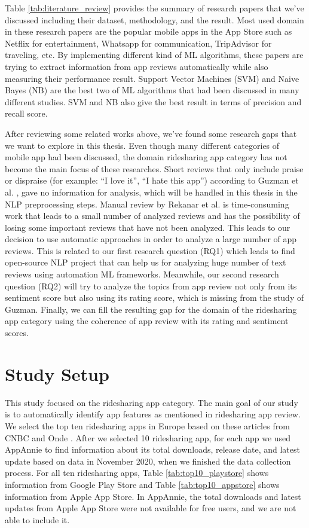 \documentclass[12pt]{article}
\begin{document}
Table \ref{tab:literature_review} provides the summary of research papers that we’ve discussed including their dataset, methodology, and the result. Most used domain in these research papers are the popular mobile apps in the App Store such as Netflix for entertainment, Whatsapp for communication, TripAdvisor for traveling, etc. By implementing different kind of ML algorithms, these papers are trying to extract information from app reviews automatically while also measuring their performance result. Support Vector Machines (SVM) and Naive Bayes (NB) are the best two of ML algorithms that had been discussed in many different studies. SVM and NB also give the best result in terms of precision and recall score.

After reviewing some related works above, we’ve found some research gaps that we want to explore in this thesis. Even though many different categories of mobile app had been discussed, the domain ridesharing app category has not become the main focus of these researches. Short reviews that only include praise or dispraise (for example: “I love it”, “I hate this app”) according to Guzman et al. \cite{fine_grained}, gave no information for analysis, which will be handled in this thesis in the NLP preprocessing steps. Manual review by Rekanar et al. \cite{sentiment_analysis_hse_ireland} is time-consuming work that leads to a small number of analyzed reviews and has the possibility of losing some important reviews that have not been analyzed. This leads to our decision to use automatic approaches in order to analyze a large number of app reviews. This is related to our first research question (RQ1) which leads to find open-source NLP project that can help us for analyzing huge number of text reviews using automation ML frameworks. Meanwhile, our second research question (RQ2) will try to analyze the topics from app review not only from its sentiment score but also using its rating score, which is missing from the study of Guzman\cite{fine_grained}. Finally, we can fill the resulting gap for the domain of the ridesharing app category using the coherence of app review with its rating and sentiment scores.

\newpage
\section{Study Setup}
This study focused on the ridesharing app category. The main goal of our study is to automatically identify app features as mentioned in ridesharing app review. We select the top ten ridesharing apps in Europe based on these articles from CNBC \cite{cnbc} and Onde \cite{onde}. After we selected 10 ridesharing app, for each app we used AppAnnie to find information about its total downloads, release date, and latest update based on data in November 2020, when we finished the data collection process. For all ten ridesharing apps, Table \ref{tab:top10_playstore} shows information from Google Play Store and Table \ref{tab:top10_appstore} shows information from Apple App Store. In AppAnnie, the total downloads and latest updates from Apple App Store were not available for free users, and we are not able to include it.
\end{document}
